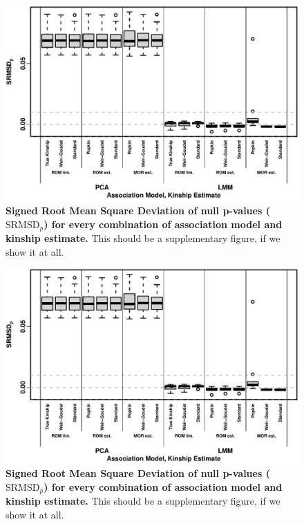 \documentclass[11pt]{article}
\newcommand{\rmsd}{\text{SRMSD}_p}
\begin{document}
\begin{figure}[bp!]
  \centering
  \includegraphics[width=\textwidth]{rmsd.pdf}
  \caption{
    {\bf Signed Root Mean Square Deviation of null p-values ($\rmsd$) for every combination of association model and kinship estimate.}
    This should be a supplementary figure, if we show it at all.
  }
  \label{fig:rmsd_sim}
\end{figure}

\begin{figure}[bp!]
  \centering
  \includegraphics[width=\textwidth]{rmsd.pdf}
  \caption{
    {\bf Signed Root Mean Square Deviation of null p-values ($\rmsd$) for every combination of association model and kinship estimate.}
    This should be a supplementary figure, if we show it at all.
  }
  \label{fig:rmsd_real}
\end{figure}
\end{document}
